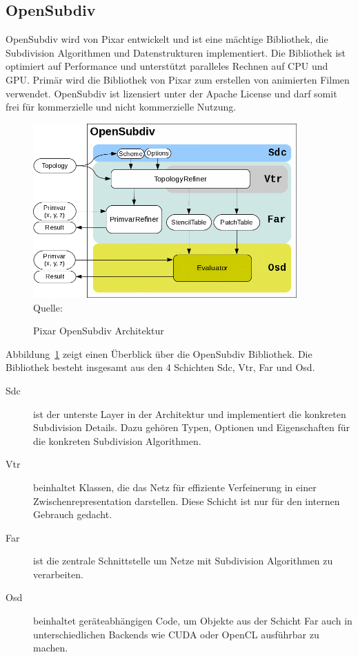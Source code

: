 \subsection{OpenSubdiv}

OpenSubdiv wird von Pixar entwickelt und ist eine mächtige Bibliothek, die Subdivision Algorithmen und Datenstrukturen implementiert.
Die Bibliothek ist optimiert auf Performance und unterstützt paralleles Rechnen auf CPU und GPU.
Primär wird die Bibliothek von Pixar zum erstellen von animierten Filmen verwendet.
OpenSubdiv ist lizensiert unter der Apache License und darf somit frei für kommerzielle und nicht kommerzielle Nutzung.

\begin{figure}[h]
  \caption{Pixar OpenSubdiv Architektur}
  \centering
  \includegraphics[width=0.9\textwidth]{content/media/pixar_opensubdiv}
  \\Quelle: \cite{Pixar.27.07.2015}
  \label{fig:pixar_opensubdiv}
\end{figure}

Abbildung~\ref{fig:pixar_opensubdiv} zeigt einen Überblick über die OpenSubdiv Bibliothek.
Die Bibliothek besteht insgesamt aus den 4 Schichten \ac{Sdc}, \ac{Vtr}, \ac{Far} und \ac{Osd}.
\cite{Pixar.27.07.2015}

\begin{description}
 \item[\acs{Sdc}] ist der unterste Layer in der Architektur und implementiert die konkreten Subdivision Details.
 Dazu gehören Typen, Optionen und Eigenschaften für die konkreten Subdivision Algorithmen.
 \item[\acs{Vtr}] beinhaltet Klassen, die das Netz für effiziente Verfeinerung in einer Zwischenrepresentation darstellen.
 Diese Schicht ist nur für den internen Gebrauch gedacht.
 \item[\acs{Far}] ist die zentrale Schnittstelle um Netze mit Subdivision Algorithmen zu verarbeiten.
 \item[\acs{Osd}] beinhaltet geräteabhängigen Code, um Objekte aus der Schicht \acs{Far} auch in unterschiedlichen Backends wie
 \acs{CUDA} oder OpenCL ausführbar zu machen.
\end{description}

